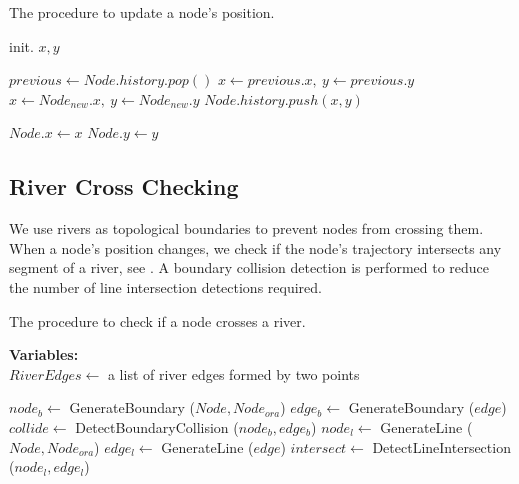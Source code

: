 \begin{algorithm}[tb!]
    \caption{The procedure to update a node's position.}\label{alg:move position}
    \begin{algorithmic}[1]
            \State {}
        \EndIf
        
        \State init. $ x,y $

            \State $previous \gets Node.history.pop() $
            \State $ x \gets previous.x,~y \gets previous.y $
        \Else
            \State $ x \gets Node_{new}.x,~y \gets Node_{new}.y $
            \State $ Node.history.push(x, y) $
        \EndIf

        \State $ Node.x \gets x $
        \State $ Node.y \gets y $
        \State {}
        \EndProcedure
    \end{algorithmic}
\end{algorithm}


\subsection{River Cross Checking}

We use rivers as topological boundaries to prevent nodes from crossing them. When a node's position changes, we check if the node's trajectory intersects any segment of a river, see . A boundary collision detection is performed to reduce the number of line intersection detections required.


\begin{algorithm}[tb!]
    \caption{The procedure to check if a node crosses a river.}\label{alg:check river crossing}
    \textbf{Variables:} \\
    $RiverEdges \gets$ a list of river edges formed by two points \\

    \begin{algorithmic}[1]
                \State $ node_b \gets $ GenerateBoundary ($ Node, Node_{ora} $)
                \State $ edge_b \gets $ GenerateBoundary ($ edge $)
                \State $ collide \gets $ DetectBoundaryCollision ($ node_b, edge_b $)
                    \State $ node_l \gets $ GenerateLine ($ Node, Node_{ora} $)
                    \State $ edge_l \gets $ GenerateLine ($ edge $)
                    \State $ intersect \gets $ DetectLineIntersection ($ node_l, edge_l $)
                        \State {}
                    \EndIf
                \EndIf
            \EndFor
            \State {}
        \EndProcedure
    \end{algorithmic}
\end{algorithm}

